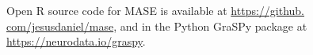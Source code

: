 \documentclass[a0,landscape]{a0poster}
\begin{document}
\begin{minipage}{0.97\textwidth}
\begin{minipage}[t]{0.3\textwidth}
\begin{minipage}{0.43\textwidth}
\begin{tcolorbox}[colback=blue!5,colframe=boxcol,title=Acknowledgements,width=\textwidth]
			\end{tcolorbox}	
		\end{minipage}\hfill
		\begin{minipage}{0.53\textwidth}
			\begin{tcolorbox}[colback=blue!5,colframe=boxcol,title=References,width=1.1\textwidth]
				{\footnotesize  
				Open R source code for MASE is available at \url{https://github.
				com/jesusdaniel/mase}, and in the Python GraSPy package at \url{https://neurodata.io/graspy}.\par}
	
			\end{tcolorbox}	

		\end{minipage}
		
		
		
		
	\end{minipage}
	\hfill
\end{minipage}
\end{document}
